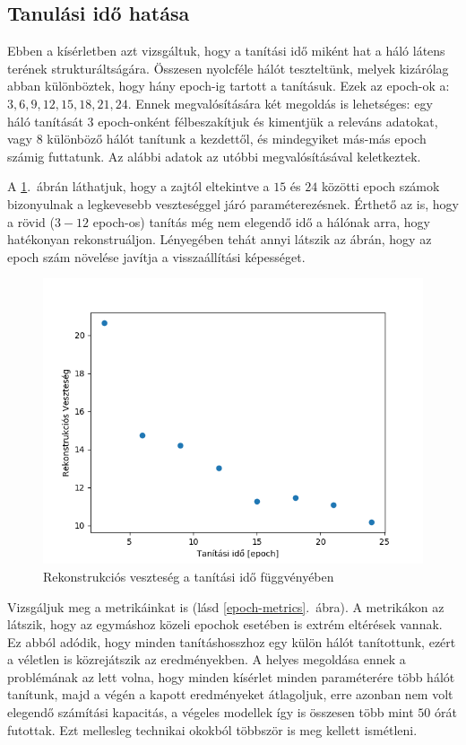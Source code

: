\subsection{Tanulási idő hatása}

Ebben a kísérletben azt vizsgáltuk, hogy a tanítási idő miként hat a háló látens terének strukturáltságára. Összesen nyolcféle hálót teszteltünk, melyek kizárólag abban különböztek, hogy hány epoch-ig tartott a tanításuk. Ezek az epoch-ok a: $3, 6, 9, 12, 15, 18, 21, 24$. Ennek megvalósítására két megoldás is lehetséges: egy háló tanítását $3$ epoch-onként félbeszakítjuk és kimentjük a releváns adatokat, vagy $8$ különböző hálót tanítunk a kezdettől, és mindegyiket más-más epoch számig futtatunk. Az alábbi adatok az utóbbi megvalósításával keletkeztek.

A \ref{epoch-loss}.~ábrán láthatjuk, hogy a zajtól eltekintve a $15$ és $24$ közötti epoch számok bizonyulnak a legkevesebb veszteséggel járó paraméterezésnek. Érthető az is, hogy a rövid ($3-12$ epoch-os) tanítás még nem elegendő idő a hálónak arra, hogy hatékonyan rekonstruáljon. Lényegében tehát annyi látszik az ábrán, hogy az epoch szám növelése javítja a visszaállítási képességet.

\begin{figure}[h!]
\begin{center}
 \begin{center}
	\includegraphics[width=0.75\linewidth]{metrics/vae_epoch-loss.png}
 \end{center}

  \caption{Rekonstrukciós veszteség a tanítási idő függvényében}\label{epoch-loss}
\end{center}
\end{figure}

Vizsgáljuk meg a metrikáinkat is (lásd \ref{epoch-metrics}.~ábra).  A metrikákon az látszik, hogy az egymáshoz közeli epochok esetében is extrém eltérések vannak. Ez abból adódik, hogy minden tanításhosszhoz egy külön hálót tanítottunk, ezért a véletlen is közrejátszik az eredményekben. A helyes megoldása ennek a problémának az lett volna, hogy minden kísérlet minden paraméterére több hálót tanítunk, majd a végén a kapott eredményeket átlagoljuk, erre azonban nem volt elegendő számítási kapacitás, a végeles modellek így is összesen több mint $50$ órát futottak. Ezt mellesleg technikai okokból többször is meg kellett ismétleni. 

